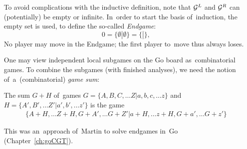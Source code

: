 To avoid complications with the inductive definition, note that $\mathcal{G}^L$ and $\mathcal{G}^R$ can (potentially) be empty or infinite.
In~order to start the basis of~induction, the empty set is used, to define the so-called \emph{Endgame}\footnotemark{}:
\[
  0 = \{ \emptyset | \emptyset \} = \{ | \},
\]
No player may move in the Endgame; the first player to~move thus always loses.

One may view independent local subgames on the Go board as~combinatorial games.
To combine the subgames (with finished analyses), we need the notion of~a~(combinatorial) \emph{game sum}:
\begin{framed}
  \begin{defn}
    The sum $G + H$ of~games $G = \{ A, B, C, \ldots Z | a, b, c, \ldots z \}$ and $H = \{ A', B', \ldots Z' | a', b', \ldots z' \}$ is the game
    \begin{align*}
      \{ A+H, \ldots Z+H,
         G+A', \ldots G+Z' |
         a+H, \ldots z+H,
         G+a', \ldots G+z' \}
    \end{align*}
  \end{defn}
\end{framed}
This was an~approach of~Martin \Mueller{} to solve endgames in~Go (Chapter~\ref{ch:goCGT}).

%
%
%
%
